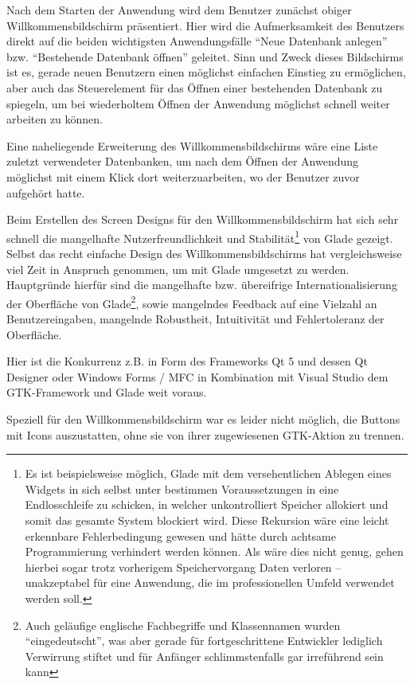 Nach dem Starten der Anwendung wird dem Benutzer zunächst obiger Willkommensbildschirm präsentiert. Hier wird die
Aufmerksamkeit des Benutzers direkt auf die beiden wichtigsten Anwendungsfälle ``Neue Datenbank anlegen'' bzw.
``Bestehende Datenbank öffnen'' geleitet. Sinn und Zweck dieses Bildschirms ist es, gerade neuen Benutzern einen möglichst
einfachen Einstieg zu ermöglichen, aber auch das Steuerelement für das Öffnen einer bestehenden Datenbank zu spiegeln,
um bei wiederholtem Öffnen der Anwendung möglichst schnell weiter arbeiten zu können.

Eine naheliegende Erweiterung des Willkommensbildschirms wäre eine Liste zuletzt verwendeter Datenbanken, um nach dem
Öffnen der Anwendung möglichst mit einem Klick dort weiterzuarbeiten, wo der Benutzer zuvor aufgehört hatte.

Beim Erstellen des Screen Designs für den Willkommensbildschirm hat sich sehr schnell die mangelhafte Nutzerfreundlichkeit
und Stabilität\footnote{Es ist beispielsweise möglich, Glade mit dem versehentlichen Ablegen eines Widgets in sich
selbst unter bestimmen Voraussetzungen in eine Endlosschleife zu schicken, in welcher unkontrolliert Speicher allokiert
und somit das gesamte System blockiert wird. Diese Rekursion wäre eine leicht erkennbare Fehlerbedingung gewesen und hätte
durch achtsame Programmierung verhindert werden können. Als wäre dies nicht genug, gehen hierbei sogar trotz vorherigem
Speichervorgang Daten verloren -- unakzeptabel für eine Anwendung, die im professionellen Umfeld verwendet werden soll.}
von Glade gezeigt. Selbst das recht einfache Design des Willkommensbildschirms hat vergleichsweise viel
Zeit in Anspruch genommen, um mit Glade umgesetzt zu werden.
Hauptgründe hierfür sind die mangelhafte bzw. übereifrige Internationalisierung der Oberfläche von Glade\footnote{Auch geläufige
englische Fachbegriffe und Klassennamen wurden ``eingedeutscht'', was aber gerade für fortgeschrittene Entwickler
lediglich Verwirrung stiftet und für Anfänger schlimmstenfalls gar irreführend sein kann}, sowie mangelndes Feedback auf
eine Vielzahl an Benutzereingaben, mangelnde Robustheit, Intuitivität und Fehlertoleranz der Oberfläche.

Hier ist die Konkurrenz z.B. in Form des Frameworks Qt 5 und dessen Qt Designer oder Windows Forms / MFC in Kombination
mit Visual Studio dem GTK-Framework und Glade weit voraus.

Speziell für den Willkommensbildschirm war es leider nicht möglich, die Buttons mit Icons auszustatten, ohne sie von ihrer
zugewiesenen GTK-Aktion zu trennen.

